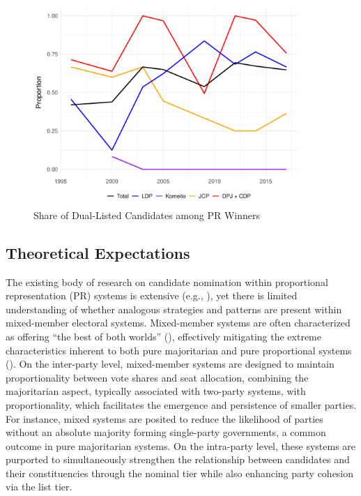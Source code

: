 \documentclass[a4paper, 11pt]{article}
\begin{document}
\begin{figure}[!htbp]
	\includegraphics[width = 0.9\textwidth]{../figure/paper/dual_nomination.pdf}
	\caption{Share of Dual-Listed Candidates among PR Winners}
	\label{fig:dual}
\end{figure}


\subsection{Theoretical Expectations}

The existing body of research on candidate nomination within proportional representation (PR) systems is extensive (e.g., \citealt{buisseret_party_2022, cox_moral_2021}), yet there is limited understanding of whether analogous strategies and patterns are present within mixed-member electoral systems. Mixed-member systems are often characterized as offering “the best of both worlds” (\citealt{hirano_policy, shugart_mixed-member_2003}), effectively mitigating the extreme characteristics inherent to both pure majoritarian and pure proportional systems (\citealt{blais_electoral_1996, reynolds_electoral_2005, shugart_mixed-member_2003}). On the inter-party level, mixed-member systems are designed to maintain proportionality between vote shares and seat allocation, combining the majoritarian aspect, typically associated with two-party systems, with proportionality, which facilitates the emergence and persistence of smaller parties. For instance, mixed systems are posited to reduce the likelihood of parties without an absolute majority forming single-party governments, a common outcome in pure majoritarian systems. On the intra-party level, these systems are purported to simultaneously strengthen the relationship between candidates and their constituencies through the nominal tier while also enhancing party cohesion via the list tier.
\end{document}
